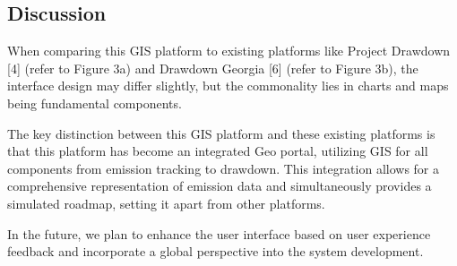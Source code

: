 \subsection{Discussion}

When comparing this GIS platform to existing platforms like Project Drawdown [4] (refer to Figure 3a) and Drawdown Georgia [6] (refer to Figure 3b), the interface design may differ slightly, but the commonality lies in charts and maps being fundamental components.\par

The key distinction between this GIS platform and these existing platforms is that this platform has become an integrated Geo portal, utilizing GIS for all components from emission tracking to drawdown. This integration allows for a comprehensive representation of emission data and simultaneously provides a simulated roadmap, setting it apart from other platforms.\par
In the future, we plan to enhance the user interface based on user experience feedback and incorporate a global perspective into the system development.\par